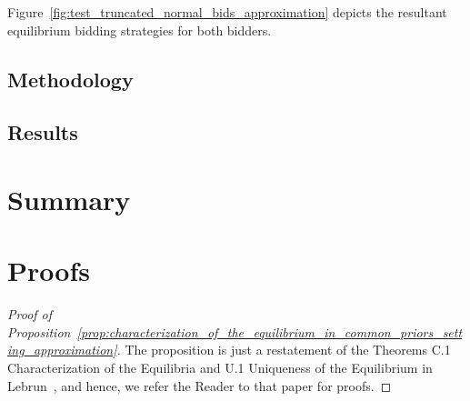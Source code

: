 Figure~\ref{fig:test_truncated_normal_bids_approximation} depicts the resultant equilibrium bidding strategies for both bidders.


\subsection{Methodology} %
\label{sub:methodology_approximation}


\subsection{Results} %
\label{sub:results_approximation}



\section{Summary} %
\label{sec:summary_approximation}


\section{Proofs} %
\label{sec:proofs_approximation}
\begin{proof}[Proof of Proposition~\ref{prop:characterization_of_the_equilibrium_in_common_priors_setting_approximation}]
The proposition is just a restatement of the Theorems C.1 Characterization of the Equilibria and U.1 Uniqueness of the Equilibrium in Lebrun~\cite{Lebrun2006}, and hence, we refer the Reader to that paper for proofs.
\end{proof}
